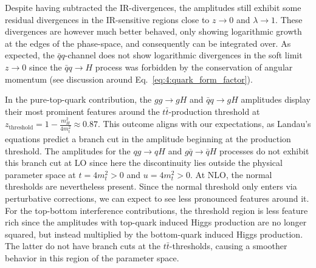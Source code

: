Despite having subtracted the \acs{IR}-divergences, the amplitudes still exhibit some residual divergences in the \acs{IR}-sensitive regions close to $z \rightarrow 0$ and $\lambda \rightarrow 1$. These divergences are however much better behaved, only showing logarithmic growth at the edges of the phase-space, and consequently can be integrated over. As expected, the $\bar{q}q$-channel does not show logarithmic divergences in the soft limit $z \rightarrow 0$ since the $\bar{q} q \rightarrow H$ process was forbidden by the conservation of angular momentum (see discussion around Eq.~\eqref{eq:4:quark_form_factor}).

In the pure-top-quark contribution, the $gg \rightarrow g H$ and $\bar{q}q \rightarrow g H$ amplitudes display their most prominent features around the $t\bar{t}$-production threshold at $z_{\mathrm{threshold}} = 1 - \frac{m_H^2}{4 m_t^2} \approx 0.87$. This outcome aligns with our expectations, as Landau's equations predict a branch cut in the amplitude beginning at the production threshold. The amplitudes for the $qg \rightarrow qH$ and $g \bar{q} \rightarrow \bar{q} H$ processes do not exhibit this branch cut at \acs{LO} since here the discontinuity lies outside the physical parameter space at $t = 4 m_t^2 > 0$ and $u = 4 m_t^2 > 0$. At \acs{NLO}, the normal thresholds are nevertheless present. Since the normal threshold only enters via perturbative corrections, we can expect to see less pronounced features around it. For the top-bottom interference contributions, the threshold region is less feature rich since the amplitudes with top-quark induced Higgs production are no longer squared, but instead multiplied by the bottom-quark induced Higgs production. The latter do not have branch cuts at the $t\bar{t}$-thresholds, causing a smoother behavior in this region of the parameter space.

